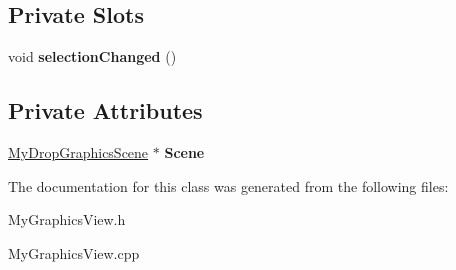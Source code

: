 \subsection*{Private Slots}
\begin{DoxyCompactItemize}
\item 
\hypertarget{class_my_graphics_view_af3639d56945d93ab9d7d509c73d83d8e}{}void {\bfseries selection\+Changed} ()\label{class_my_graphics_view_af3639d56945d93ab9d7d509c73d83d8e}

\end{DoxyCompactItemize}
\subsection*{Private Attributes}
\begin{DoxyCompactItemize}
\item 
\hypertarget{class_my_graphics_view_a96bd1f2147b155a6efb1e407e5784200}{}\hyperlink{class_my_drop_graphics_scene}{My\+Drop\+Graphics\+Scene} $\ast$ {\bfseries Scene}\label{class_my_graphics_view_a96bd1f2147b155a6efb1e407e5784200}

\end{DoxyCompactItemize}


The documentation for this class was generated from the following files\+:\begin{DoxyCompactItemize}
\item 
My\+Graphics\+View.\+h\item 
My\+Graphics\+View.\+cpp\end{DoxyCompactItemize}
